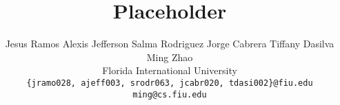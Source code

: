 \documentclass[letterpaper,twocolumn,10pt]{article}
\title{\Large \bf Placeholder}
\author{
  {\rm Jesus Ramos}
  \qquad
  {\rm Alexis Jefferson}
  \qquad
  {\rm Salma Rodriguez}
  \qquad
  {\rm Jorge Cabrera}
  \qquad
  {\rm Tiffany Dasilva}
  \\
  \qquad
  {\rm Ming Zhao}
  \\
  Florida International University
  \\
  {\rm \texttt{\{jramo028, ajeff003, srodr063, jcabr020, tdasi002\}@fiu.edu}}
  \\
  {\rm \texttt{ming@cs.fiu.edu}}
}
\date{}
\begin{document}
\maketitle












{
  \footnotesize
  
  
}
\end{document}
